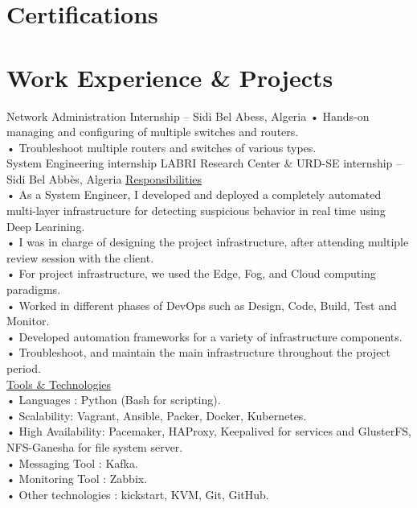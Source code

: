 \documentclass{cv}
\begin{document}
\section{Certifications}


\section{Work Experience \& Projects}

    {Network Administration Internship}
	{  -- Sidi Bel Abess, Algeria\vspace{.2cm}}
    {
      • Hands-on managing and configuring of multiple switches and routers.\\
      • Troubleshoot multiple routers and switches of various types.\\
    }
    {System Engineering internship %
    }
    {LABRI Research Center  \& URD-SE internship -- Sidi Bel Abbès, Algeria\vspace{.2cm}}
    {
      \underline {Responsibilities}\vspace{.2cm}\\
      • As a System Engineer, I developed and deployed a completely automated multi-layer infrastructure 
      for detecting suspicious behavior in real time using Deep Learining.\\
      • I was in charge of designing the project infrastructure, after attending multiple review session 
      with the client.\\
      • For project infrastructure, we used the Edge, Fog, and Cloud computing paradigms.\\
      • Worked in different phases of DevOps such as Design, Code, Build, Test and Monitor.\\
      • Developed automation frameworks for a variety of infrastructure components.\\
      • Troubleshoot, and maintain the main infrastructure throughout the project period.\\
      \underline {Tools \& Technologies}\\
      • Languages : Python (Bash for scripting).\\
      • Scalability: Vagrant, Ansible, Packer, Docker, Kubernetes.\\
      • High Availability: Pacemaker, HAProxy, Keepalived for services and GlusterFS, NFS-Ganesha for file system server.\\
      • Messaging Tool : Kafka.\\
      • Monitoring Tool : Zabbix.\\
      • Other technologies : kickstart, KVM, Git, GitHub.\\
    }
\end{document}
